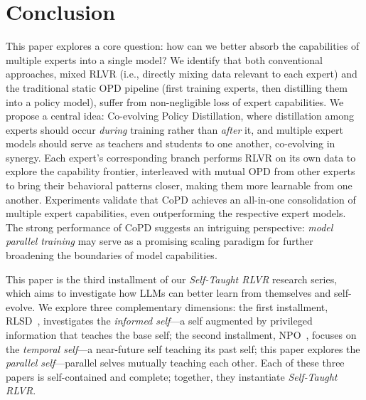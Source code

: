 \section{Conclusion}
This paper explores a core question: how can we better absorb the capabilities of multiple experts into a single model? We identify that both conventional approaches, mixed RLVR (i.e., directly mixing data relevant to each expert) and the traditional static OPD pipeline (first training experts, then distilling them into a policy model), suffer from non-negligible loss of expert capabilities. We propose a central idea: Co-evolving Policy Distillation, where distillation among experts should occur \textit{during} training rather than \textit{after} it, and multiple expert models should serve as teachers and students to one another, co-evolving in synergy. Each expert's corresponding branch performs RLVR on its own data to explore the capability frontier, interleaved with mutual OPD from other experts to bring their behavioral patterns closer, making them more learnable from one another. Experiments validate that CoPD achieves an all-in-one consolidation of multiple expert capabilities, even outperforming the respective expert models. The strong performance of CoPD suggests an intriguing perspective: \textit{model parallel training} may serve as a promising scaling paradigm for further broadening the boundaries of model capabilities.


This paper is the third installment of our \textit{Self-Taught RLVR} research series, which aims to investigate how LLMs can better learn from themselves and self-evolve. We explore three complementary dimensions: the first installment, RLSD~\cite{yang2026selfdistilledrlvr}, investigates the \textit{informed self}---a self augmented by privileged information that teaches the  base self; the second installment, NPO~\cite{qin2026nearfuturepolicyoptimization}, focuses on the \textit{temporal self}---a near-future self teaching its past self; this paper explores the \textit{parallel self}---parallel selves mutually teaching each other. Each of these three papers is self-contained and complete; together, they instantiate \textit{Self-Taught RLVR}.


